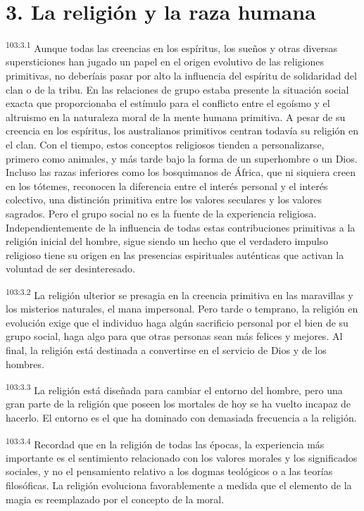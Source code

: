 \documentclass[twoside, 11pt]{book}
\begin{document}
\section*{3. La religión y la raza humana}
\par
\textsuperscript{103:3.1} Aunque todas las creencias en los espíritus, los sueños y otras diversas supersticiones han jugado un papel en el origen evolutivo de las religiones primitivas, no deberíais pasar por alto la influencia del espíritu de solidaridad del clan o de la tribu. En las relaciones de grupo estaba presente la situación social exacta que proporcionaba el estímulo para el conflicto entre el egoísmo y el altruismo en la naturaleza moral de la mente humana primitiva. A pesar de su creencia en los espíritus, los australianos primitivos centran todavía su religión en el clan. Con el tiempo, estos conceptos religiosos tienden a personalizarse, primero como animales, y más tarde bajo la forma de un superhombre o un Dios. Incluso las razas inferiores como los bosquimanos de África, que ni siquiera creen en los tótemes, reconocen la diferencia entre el interés personal y el interés colectivo, una distinción primitiva entre los valores seculares y los valores sagrados. Pero el grupo social no es la fuente de la experiencia religiosa. Independientemente de la influencia de todas estas contribuciones primitivas a la religión inicial del hombre, sigue siendo un hecho que el verdadero impulso religioso tiene su origen en las presencias espirituales auténticas que activan la voluntad de ser desinteresado.

\par
\textsuperscript{103:3.2} La religión ulterior se presagia en la creencia primitiva en las maravillas y los misterios naturales, el mana impersonal. Pero tarde o temprano, la religión en evolución exige que el individuo haga algún sacrificio personal por el bien de su grupo social, haga algo para que otras personas sean más felices y mejores. Al final, la religión está destinada a convertirse en el servicio de Dios y de los hombres.

\par
\textsuperscript{103:3.3} La religión está diseñada para cambiar el entorno del hombre, pero una gran parte de la religión que poseen los mortales de hoy se ha vuelto incapaz de hacerlo. El entorno es el que ha dominado con demasiada frecuencia a la religión.

\par
\textsuperscript{103:3.4} Recordad que en la religión de todas las épocas, la experiencia más importante es el sentimiento relacionado con los valores morales y los significados sociales, y no el pensamiento relativo a los dogmas teológicos o a las teorías filosóficas. La religión evoluciona favorablemente a medida que el elemento de la magia es reemplazado por el concepto de la moral.
\end{document}
